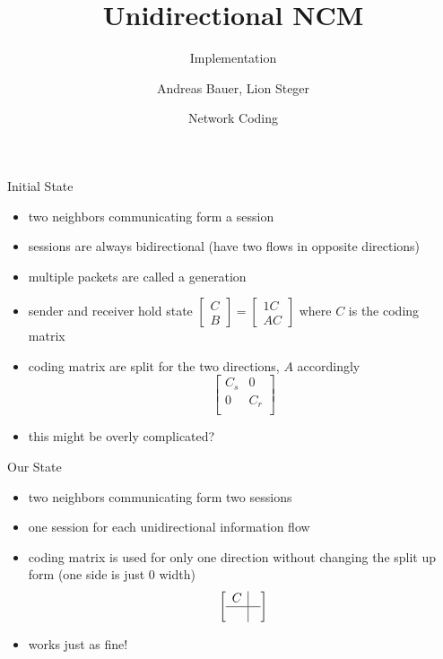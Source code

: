 \documentclass[11pt]{beamer}
\title[Short version]{Unidirectional NCM}
\subtitle[short version]{Implementation}
\date[2021]{Network Coding}
\author[Andreas Bauer, Lion Steger]{Andreas Bauer, Lion Steger}
\institute[Technische Universität München]{Technische Universität München}
\begin{document}
	\frame{\maketitle}
	
	\begin{frame}{Initial State}
		\begin{itemize}
			\item two neighbors communicating form a session
			\item sessions are always bidirectional (have two flows in opposite directions)
			\item multiple packets are called a generation
			\item sender and receiver hold state $ \begin{bmatrix}
				C \\ B
			\end{bmatrix} = \begin{bmatrix}
				1 C \\ A C
			\end{bmatrix} $ where $ C $ is the coding matrix
			\item coding matrix are split for the two directions, $A$ accordingly
			\[
			\left[
			\begin{array}{c|c}
			C_s & 0 \\ \hline
			0 & C_r \\
			\end{array}
			\right]
			\]
			\item this might be overly complicated?
		\end{itemize}
	\end{frame}

	\begin{frame}{Our State}
		\begin{itemize}
			\item two neighbors communicating form two sessions
			\item one session for each unidirectional information flow
			\item coding matrix is used for only one direction without changing the split up form (one side is just 0 width)
			\[
			\left[
			\begin{array}{c|c}
			C &  \\ \hline
			  &  \\
			\end{array}
			\right]
			\]
			\item works just as fine!
		\end{itemize}
	\end{frame}
\end{document}
